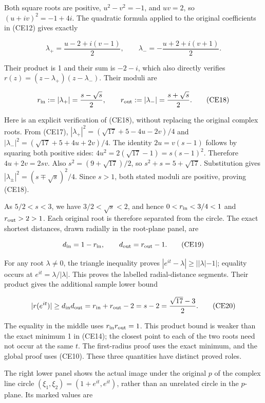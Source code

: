 \documentclass[
  11pt,
]{article}
\begin{document}
Both square roots are positive, \(u^2-v^2=-1\), and \(uv=2\), so
\((u+iv)^2=-1+4i\). The quadratic formula applied to the original
coefficients in (CE12) gives exactly

\[
 \lambda_+=\frac{u-2+i(v-1)}2,
 \qquad
 \lambda_-=-\frac{u+2+i(v+1)}2.                              \tag{CE17}
\]

Their product is 1 and their sum is \(-2-i\), which also directly
verifies \(r(z)=(z-\lambda_+)(z-\lambda_-)\). Their moduli are

\[
 r_{\rm in}:=|\lambda_+|=\frac{s-\sqrt s}{2},\qquad
 r_{\rm out}:=|\lambda_-|=\frac{s+\sqrt s}{2}.                 \tag{CE18}
\]

Here is an explicit verification of (CE18), without replacing the
original complex roots. From (CE17),
\(|\lambda_+|^2=(\sqrt{17}+5-4u-2v)/4\) and
\(|\lambda_-|^2=(\sqrt{17}+5+4u+2v)/4\). The identity \(2u=v(s-1)\)
follows by squaring both positive sides:
\(4u^2=2(\sqrt{17}-1)=s(s-1)^2\). Therefore \(4u+2v=2sv\). Also
\(s^2=(9+\sqrt{17})/2\), so \(s^2+s=5+\sqrt{17}\). Substitution gives
\(|\lambda_\pm|^2=(s\mp\sqrt s)^2/4\). Since \(s>1\), both stated moduli
are positive, proving (CE18).

As \(5/2<s<3\), we have \(3/2<\sqrt s<2\), and hence
\(0<r_{\rm in}<3/4<1\) and \(r_{\rm out}>2>1\). Each original root is
therefore separated from the circle. The exact shortest distances, drawn
radially in the root-plane panel, are

\[
 d_{\rm in}=1-r_{\rm in},\qquad
 d_{\rm out}=r_{\rm out}-1.                                 \tag{CE19}
\]

For any root \(\lambda\neq0\), the triangle inequality proves
\(|e^{it}-\lambda|\geq||\lambda|-1|\); equality occurs at
\(e^{it}=\lambda/|\lambda|\). This proves the labelled radial-distance
segments. Their product gives the additional sample lower bound

\[
 |r(e^{it})|\geq d_{\rm in}d_{\rm out}
       =r_{\rm in}+r_{\rm out}-2
       =s-2=\frac{\sqrt{17}-3}{2}.                           \tag{CE20}
\]

The equality in the middle uses \(r_{\rm in}r_{\rm out}=1\). This
product bound is weaker than the exact minimum 1 in (CE14); the closest
point to each of the two roots need not occur at the same \(t\). The
first-radius proof uses the exact minimum, and the global proof uses
(CE10). These three quantities have distinct proved roles.

The right lower panel shows the actual image under the original \(p\) of
the complex line circle \((\xi_1,\xi_2)=(1+e^{it},e^{it})\), rather than
an unrelated circle in the \(p\)-plane. Its marked values are
\end{document}
